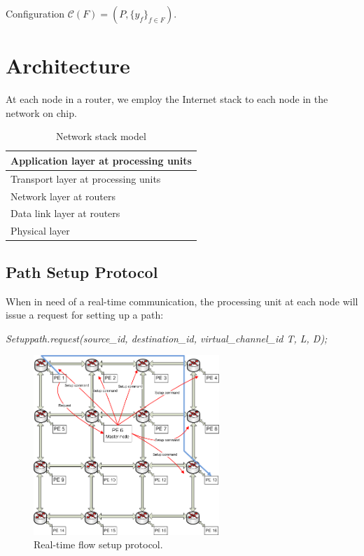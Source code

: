 \documentclass[conference, twocolumn]{IEEEtran}
\theoremstyle{definition}
\begin{document}
Configuration $\mathcal{C}(F)=(P, \{y_f\}_{f \in F})$.
\section{Architecture}
At each node in a router, we employ the Internet stack to each node in the 
network on chip.
\begin{table}[h]
\begin{center}
  \begin{tabular}{ | l | }
    \hline
    Application layer at processing units \\ \hline
    Transport layer at processing units \\ \hline
    Network layer at routers \\ \hline
	Data link layer at routers \\ \hline
	Physical layer \\
    \hline
  \end{tabular}
\end{center}
\caption{Network stack model}
\label{table:NetworkStack}
\end{table}

\subsection{Path Setup Protocol}
When in need of a real-time communication, the processing unit at each node 
will issue a request for setting up a path:

{\em Setuppath.request(source\_id, destination\_id, virtual\_channel\_id T, L,
D);}

\begin{figure}[htp]
\centering
\includegraphics[width=7cm]{pics/Protocol2}
\caption[Setup request for a real-time flow.]
{Real-time flow setup protocol.}\label{fig:ReqSetup}
\end{figure}
\end{document}

